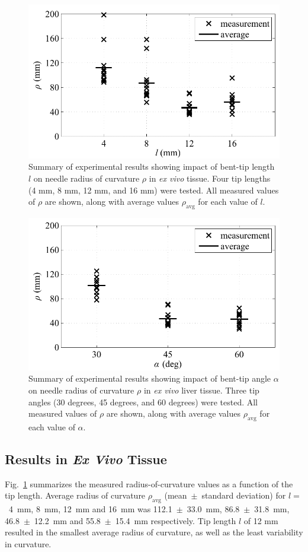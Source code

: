 \begin{figure}[!t]
\centering
\includegraphics[width=0.6\columnwidth]{Images/Chapter3/CurvatureVsLength/CurvatureVsLength}%
\caption[Impact of bent-tip length $l$ on needle radius of curvature $\rho$]{Summary of experimental results showing impact of bent-tip length $l$ on needle radius of curvature $\rho$ in \textit{ex vivo} tissue. Four tip lengths (4 mm, 8 mm, 12 mm, and 16 mm) were tested. All measured values of $\rho$ are shown, along with average values $\rho_{\text{avg}}$ for each value of $l$.}
\label{fig:CurvatureVsLength}
\end{figure}

\begin{figure}[!t]
\centering
\includegraphics[width=0.6\columnwidth]{Images/Chapter3/CurvatureVsAngle/CurvatureVsAngle}%
\caption[Impact of bent-tip angle $\alpha$ on needle radius of curvature $\rho$]{Summary of experimental results showing impact of bent-tip angle $\alpha$ on needle radius of curvature $\rho$ in \textit{ex vivo} liver tissue. Three tip angles (30 degrees, 45 degrees, and 60 degrees) were tested. All measured values of $\rho$ are shown, along with average values $\rho_{\text{avg}}$ for each value of $\alpha$.}
\label{fig:CurvatureVsAngle}
\end{figure} 

\subsection{Results in \textit{Ex Vivo} Tissue}
Fig.~\ref{fig:CurvatureVsLength} summarizes the measured radius-of-curvature values as a function of the tip length. Average radius of curvature $\rho_{\text{avg}}$ (mean~$\pm$~standard deviation) for $l =$~4~mm, 8~mm, 12~mm and 16~mm was 112.1~$\pm$~33.0~mm, 86.8~$\pm$~31.8~mm, 46.8~$\pm$~12.2~mm and 55.8~$\pm$~15.4~mm respectively. Tip length $l$ of 12 mm resulted in the smallest average radius of curvature, as well as the least variability in curvature. 

